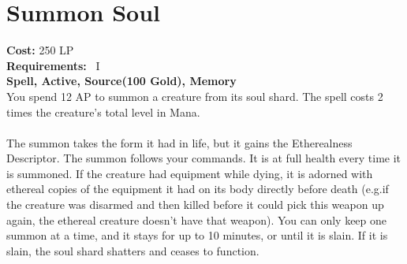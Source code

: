 \section{Summon Soul}\label{spell:summonSoul}
\textbf{Cost:} 250 LP\\
\textbf{Requirements:}~ I\\
\textbf{Spell, Active, Source(100 Gold), Memory}\\
You spend 12 AP to summon a creature from its soul shard.
The spell costs 2 times the creature's total level in Mana.\\
\\
The summon takes the form it had in life, but it gains the Etherealness Descriptor.
The summon follows your commands.
It is at full health every time it is summoned.
If the creature had equipment while dying, it is adorned with ethereal copies of the equipment it had on its body directly before death (e.g.if the creature was disarmed and then killed before it could pick this weapon up again, the ethereal creature doesn't have that weapon).
You can only keep one summon at a time, and it stays for up to 10 minutes, or until it is slain.
If it is slain, the soul shard shatters and ceases to function.\\